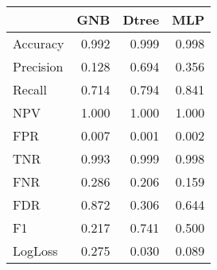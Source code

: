 \begin{tabular}{lrrr}
\toprule
{} &    GNB &  Dtree &    MLP \\
\midrule
Accuracy  &  0.992 &  0.999 &  0.998 \\
Precision &  0.128 &  0.694 &  0.356 \\
Recall    &  0.714 &  0.794 &  0.841 \\
NPV       &  1.000 &  1.000 &  1.000 \\
FPR       &  0.007 &  0.001 &  0.002 \\
TNR       &  0.993 &  0.999 &  0.998 \\
FNR       &  0.286 &  0.206 &  0.159 \\
FDR       &  0.872 &  0.306 &  0.644 \\
F1        &  0.217 &  0.741 &  0.500 \\
LogLoss   &  0.275 &  0.030 &  0.089 \\
\bottomrule
\end{tabular}
